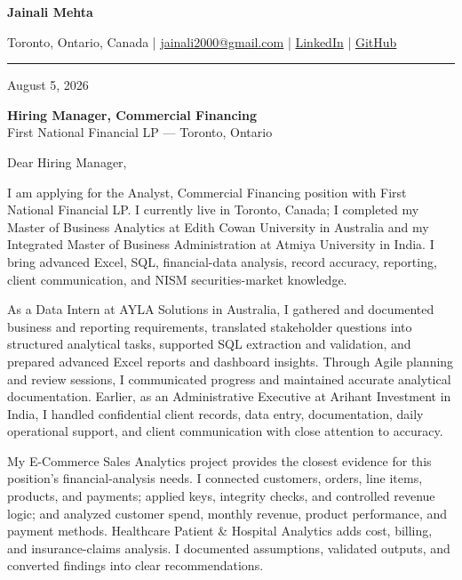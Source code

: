 \documentclass[letterpaper,10pt]{article}
\begin{document}
\begin{center}
  {\fontsize{17}{19}\selectfont\textbf{Jainali Mehta}}\par\vspace{2pt}
  \small Toronto, Ontario, Canada \;|\;
  \href{mailto:jainali2000@gmail.com}{jainali2000@gmail.com} \;|\;
  \href{https://www.linkedin.com/in/jainali-mehta}{LinkedIn} \;|\;
  \href{https://github.com/jainalimehta}{GitHub}
\end{center}
\vspace{-5pt}
\noindent\rule{\textwidth}{0.4pt}

August 5, 2026

\textbf{Hiring Manager, Commercial Financing}\\
First National Financial LP --- Toronto, Ontario

Dear Hiring Manager,

I am applying for the Analyst, Commercial Financing position with First National Financial LP. I currently live in Toronto, Canada; I completed my Master of Business Analytics at Edith Cowan University in Australia and my Integrated Master of Business Administration at Atmiya University in India. I bring advanced Excel, SQL, financial-data analysis, record accuracy, reporting, client communication, and NISM securities-market knowledge.

As a Data Intern at AYLA Solutions in Australia, I gathered and documented business and reporting requirements, translated stakeholder questions into structured analytical tasks, supported SQL extraction and validation, and prepared advanced Excel reports and dashboard insights. Through Agile planning and review sessions, I communicated progress and maintained accurate analytical documentation. Earlier, as an Administrative Executive at Arihant Investment in India, I handled confidential client records, data entry, documentation, daily operational support, and client communication with close attention to accuracy.

My E-Commerce Sales Analytics project provides the closest evidence for this position's financial-analysis needs. I connected customers, orders, line items, products, and payments; applied keys, integrity checks, and controlled revenue logic; and analyzed customer spend, monthly revenue, product performance, and payment methods. Healthcare Patient \& Hospital Analytics adds cost, billing, and insurance-claims analysis. I documented assumptions, validated outputs, and converted findings into clear recommendations.
\end{document}
